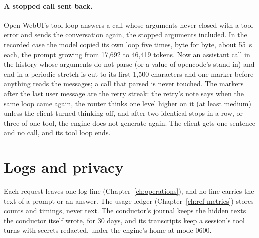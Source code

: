 \paragraph{A stopped call sent back.} Open WebUI's tool loop answers a call whose arguments never closed with a tool error and sends the conversation again, the stopped arguments included. In the recorded case the model copied its own loop five times, byte for byte, about 55~s each, the prompt growing from 17,692 to 46,419 tokens. Now an assistant call in the history whose arguments do not parse (or a value of opencode's  stand-in) and end in a periodic stretch is cut to its first 1,500 characters and one marker before anything reads the messages; a call that parsed is never touched. The markers after the last user message are the retry streak: the retry's note says when the same loop came again, the router thinks one level higher on it (at least medium) unless the client turned thinking off, and after two identical stops in a row, or three of one tool, the engine does not generate again. The client gets one sentence and no call, and its tool loop ends.

\section{Logs and privacy}

Each request leaves one log line (Chapter~\ref{ch:operations}), and no line carries the text of a prompt or an answer. The usage ledger (Chapter~\ref{ch:ref-metrics}) stores counts and timings, never text. The conductor's journal keeps the hidden texts the conductor itself wrote, for 30 days, and its transcripts keep a session's tool turns with secrets redacted, under the engine's home at mode 0600.
